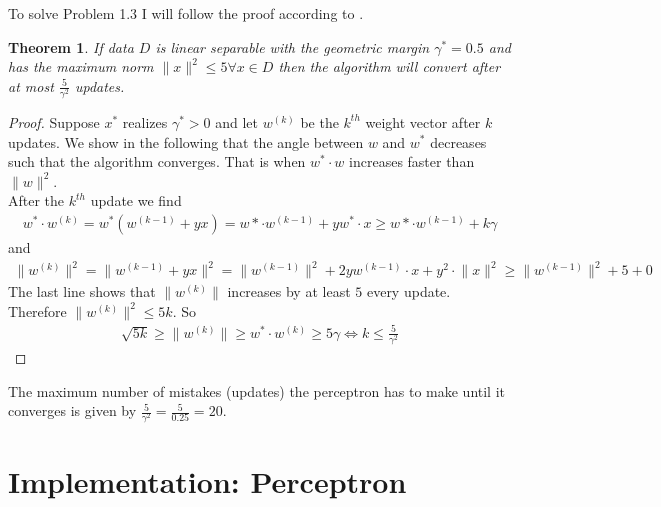 \documentclass[12pt]{article}
\newtheorem{theorem}{Theorem}[section]
\begin{document}
\noindent
To solve Problem 1.3 I will follow the proof according to \cite{CIML}. 
\begin{theorem}
	If data $D$ is linear separable with the geometric margin $\gamma^* = 0.5$ and has the maximum norm $\lVert x \rVert^{2}\leq 5 \forall x \in D$ then the algorithm will convert after at most $\frac{5}{\gamma^2}$ updates. 
\end{theorem}
\begin{proof}
	Suppose $x^*$ realizes $\gamma^*>0$ and let $w^{(k)}$ be the $k^{th}$ weight vector after $k$ updates. We show in the following that the angle between $w$ and $w^*$ decreases such that the algorithm converges. That is when $w^*\cdot w$ increases faster than $\lVert w \rVert^2$.\\
	After the $k^{th}$ update we find
	\begin{align*}
		w^*\cdot w^{(k)} = w^{*}\left( w^{(k-1)}+yx \right) = w*\cdot w^{(k-1)} + yw^*\cdot x \geq w*\cdot w^{(k-1)} + k\gamma 
	\end{align*}
	and
	\begin{align*}
		\lVert w^{(k)} \rVert^2=\lVert w^{(k-1)} + yx \rVert^2 = \lVert w^{(k-1)} \rVert^2 + 2yw^{(k-1)}\cdot x + y^2\cdot\lVert x \rVert^2 \geq \lVert w^{(k-1)} \rVert^2 +5 +0
	\end{align*}
	The last line shows that $\lVert w^{(k)} \rVert$ increases by at least $5$ every update. Therefore $\lVert w^{(k)} \rVert^2 \leq 5k$. So
	\begin{align*}
	\sqrt{5k} \geq \lVert w^{(k)} \rVert \geq w^*\cdot w^{(k)} \geq 5\gamma \Leftrightarrow k \leq \frac{5}{\gamma^2}
	\end{align*}
\end{proof}
\noindent
The maximum number of mistakes (updates) the perceptron has to make until it converges is given by $\frac{5}{\gamma^2}=\frac{5}{0.25}=20$.

\section{Implementation: Perceptron}
\end{document}
